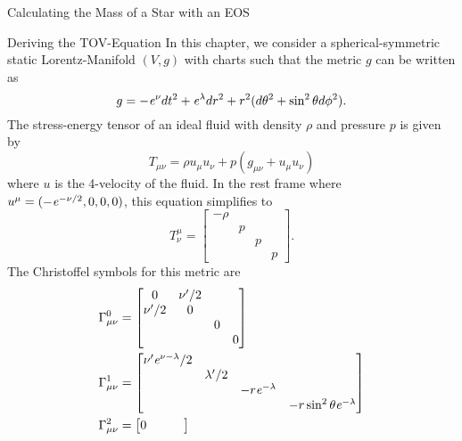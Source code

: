 \begin{section}{Calculating the Mass of a Star with an EOS}
\begin{subsection}{Deriving the TOV-Equation}
\label{3-Mass-TOVDerivation}
In this chapter, we consider a spherical-symmetric static Lorentz-Manifold $(V,g)$ with charts such that the metric $g$ can be written as
\begin{equation}
	g=-\mathit{e}^\nu dt^2+\mathit{e}^\lambda dr^2 + r^2(d\theta^2+\sin^2\theta d\phi^2).
\end{equation}
The stress-energy tensor of an ideal fluid with density $\rho$ and pressure $p$ is given by
\begin{equation}
	T_{\mu\nu}=\rho u_\mu u_\nu + p(g_{\mu\nu}+u_\mu u_\nu)
\end{equation}
where $u$ is the 4-velocity of the fluid. In the rest frame where $u^\mu=(-\mathit{e}^{-\nu/2},0,0,0)$, this equation simplifies to
\begin{equation}
	T^\mu_\nu=\begin{bmatrix}
	           	-\rho	& 	& 	&\\
	           	&		p	&	&\\
	           	&		&	p	&\\
				&		&	&	p
	           \end{bmatrix}.
\end{equation}
The Christoffel symbols for this metric are
\begin{align}
	\Gamma_{\mu\nu}^0 &= \begin{bmatrix}
	                     	0 & \nu'/2 & & \\
	                     	\nu'/2 & 0 & & \\
	                     	& & 0 &\\
	                     	& & & 0
	                     \end{bmatrix}\\
	\Gamma_{\mu\nu}^1 &= \begin{bmatrix}
	                     	\nu'\mathit{e}^{\nu-\lambda}/2 & & &\\
	                     	& \lambda'/2 & & \\
	                     	& & -r\mathit{e}^{-\lambda} & \\
	                     	& & & -r\sin^2\theta\mathit{e}^{-\lambda}
	                     \end{bmatrix}\\
	\Gamma_{\mu\nu}^2 &= \begin{bmatrix}
	                     	0 & & &\\

\end{bmatrix}
\end{align}
\end{subsection}
\end{section}
